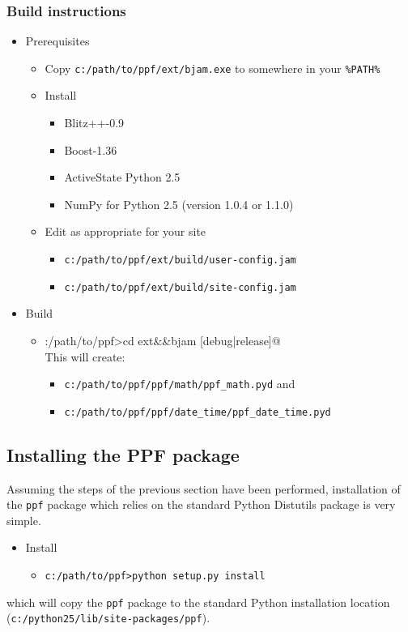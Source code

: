 \subsubsection{Build instructions}
\begin{itemize}
  \item{Prerequisites}
  \begin{itemize}
    \item{Copy \verb|c:/path/to/ppf/ext/bjam.exe| to somewhere in your \verb|%PATH%|}
    \item{Install}
    \begin{itemize}
      \item{Blitz++-0.9}
      \item{Boost-1.36}
      \item{ActiveState Python 2.5}
      \item{NumPy for Python 2.5 (version 1.0.4 or 1.1.0)}
    \end{itemize}
    \item{Edit as appropriate for your site}
    \begin{itemize}
      \item{\verb|c:/path/to/ppf/ext/build/user-config.jam|}
      \item{\verb|c:/path/to/ppf/ext/build/site-config.jam|}
    \end{itemize}
  \end{itemize}
  \item{Build}
  \begin{itemize}
    \item{\verb@c:/path/to/ppf>cd ext&&bjam [debug|release]@\\This will create:}
    \begin{itemize}
      \item{\verb|c:/path/to/ppf/ppf/math/ppf_math.pyd| and}
      \item{\verb|c:/path/to/ppf/ppf/date_time/ppf_date_time.pyd|}
    \end{itemize}
  \end{itemize}
\end{itemize}

\subsection{Installing the PPF package}

Assuming the steps of the previous section have been performed,
installation of the \verb|ppf| package which relies on the standard Python
Distutils package is very simple.
\begin{itemize}
  \item{Install}
  \begin{itemize}
    \item{\verb|c:/path/to/ppf>python setup.py install|}
  \end{itemize}
\end{itemize}
which will copy the \verb|ppf| package to the standard Python
installation location (\verb|c:/python25/lib/site-packages/ppf|).

